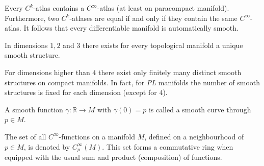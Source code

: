     \begin{theorem}[Whitney]
        Every $C^k$-atlas contains a $C^\infty$-atlas (at least on paracompact manifold). Furthermore, two $C^k$-atlases are equal if and only if they contain the same $C^\infty$-atlas. It follows that every differentiable manifold is automatically smooth.
    \end{theorem}

    \begin{theorem}\label{diff:rado_moise}
        In dimensions $1,2$ and $3$ there exists for every topological manifold a unique smooth structure.
    \end{theorem}
    \begin{theorem}
        For dimensions higher than $4$ there exist only finitely many distinct smooth structures on compact manifolds. In fact, for \textit{PL} manifolds the number of smooth structures is fixed for each dimension (except for $4$).
    \end{theorem}

    \begin{example}\label{diff:curve}
        A smooth function $\gamma:\mathbb{R}\rightarrow M$ with $\gamma(0)=p$ is called a smooth curve through $p\in M$.
    \end{example}

    \begin{notation}
        The set of all $C^\infty$-functions on a manifold $M$, defined on a neighbourhood of $p\in M$, is denoted by $C^\infty_p(M)$. This set forms a commutative ring when equipped with the usual sum and product (composition) of functions.
    \end{notation}

